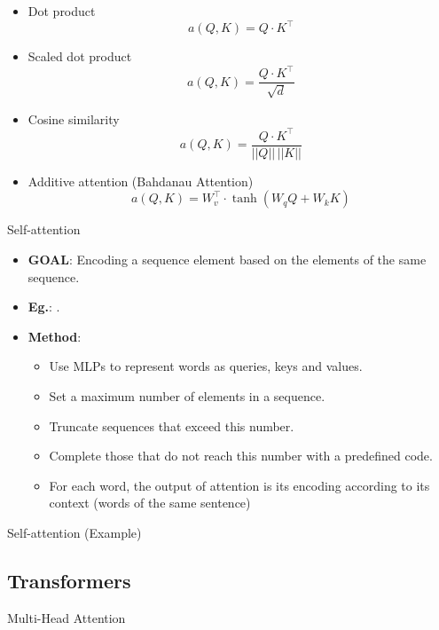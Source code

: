 \documentclass{KBook}
\begin{document}
	\begin{itemize}
		
		\item Dot product
		\[a(Q, K) = Q \cdot K^\top \]
		
		\item Scaled dot product 
		\[a(Q, K) = \frac{Q \cdot K^\top}{\sqrt{d}}\]
		
		\item Cosine similarity
		\[a(Q, K) = \frac{Q \cdot K^\top}{||Q|| \, ||K||}\]
		
		\item Additive attention (Bahdanau Attention)
		\[a(Q, K) = W_v^\top \cdot \tanh(W_q Q + W_k K)\]
	\end{itemize}
	
Self-attention
	
	\begin{itemize}
		\item \textbf{GOAL}: Encoding a sequence element based on the elements of the same sequence.
		\item \textbf{Eg.}: .
		\item \textbf{Method}:
		\begin{itemize}
			\item Use MLPs to represent words as queries, keys and values.
			\item Set a maximum number of elements in a sequence.
			\item Truncate sequences that exceed this number.
			\item Complete those that do not reach this number with a predefined code.
			\item For each word, the output of attention is its encoding according to its context (words of the same sentence)
		\end{itemize}
	\end{itemize}
	
Self-attention (Example)
	
	\begin{center}
	\end{center}
	


\subsection{Transformers}

Multi-Head Attention
	
\end{document}
